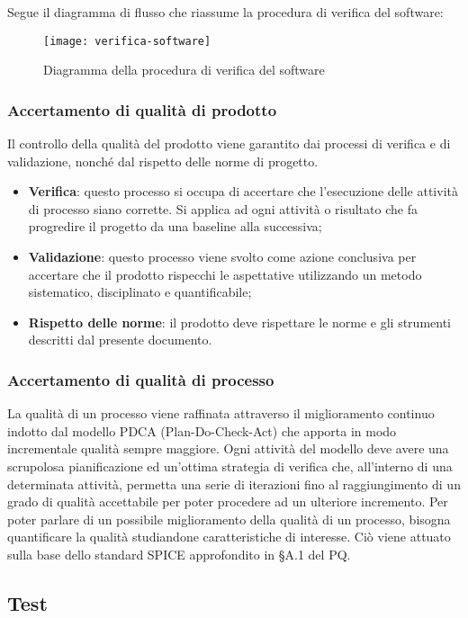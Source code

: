 \documentclass[../NormediProgetto.tex]{subfiles}
\begin{document}
Segue il diagramma di flusso che riassume la procedura di verifica del software:

\begin{figure}[H]
	\texttt{[image: verifica-software]}
	\centering
	\caption{Diagramma della procedura di verifica del software}
\end{figure}

\subsubsection{Accertamento di qualità di prodotto}
Il controllo della qualità del prodotto viene garantito dai processi di verifica e di validazione, nonché dal rispetto delle norme di progetto.
\begin{itemize}
	\item \textbf{Verifica}: questo processo si occupa di accertare che l’esecuzione delle attività
	di processo siano corrette. Si applica ad ogni attività o risultato che fa progredire il progetto da una baseline alla successiva;
	\item \textbf{Validazione}: questo processo viene svolto come azione conclusiva per accertare
	che il prodotto rispecchi le aspettative utilizzando un metodo sistematico, disciplinato
	e quantificabile;
	\item \textbf{Rispetto delle norme}: il prodotto deve rispettare le norme e gli strumenti descritti dal
	presente documento.
\end{itemize}

\subsubsection{Accertamento di qualità di processo}
La qualità di un processo viene raffinata attraverso il miglioramento continuo indotto dal modello PDCA (Plan-Do-Check-Act) che apporta in modo incrementale qualità sempre maggiore. Ogni attività del modello deve avere una scrupolosa pianificazione ed un’ottima strategia di verifica che, all’interno di una determinata attività, permetta una serie di iterazioni fino al raggiungimento di un grado di qualità accettabile per poter procedere ad un ulteriore incremento. Per poter parlare di un possibile miglioramento della qualità di un processo, bisogna quantificare la qualità studiandone caratteristiche di interesse. Ciò viene attuato sulla base dello standard SPICE approfondito in §A.1 del PQ.

\subsection{Test}
\end{document}
